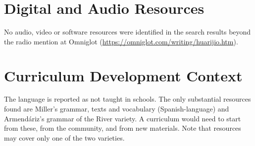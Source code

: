 \documentclass[12pt]{article}
\begin{document}
\section{Digital and Audio Resources}
No audio, video or software resources were identified in the search results beyond the radio mention at Omniglot (\url{https://omniglot.com/writing/huarijio.htm}).

\section{Curriculum Development Context}
The language is reported as not taught in schools. The only substantial resources found are Miller's grammar, texts and vocabulary (Spanish-language) and Armend\'ariz's grammar of the River variety. A curriculum would need to start from these, from the community, and from new materials. Note that resources may cover only one of the two varieties.
\end{document}
